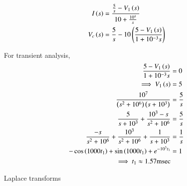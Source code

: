 \documentclass[journal,12pt,twocolumn]{IEEEtran}
\begin{document}
\begin{align}
    I\left(s\right) &= \frac{\frac{5}{s} - V_1\left(s\right)}{10 + \frac{10^4}{s}}\\
    V_c\left(s\right) &= \frac{5}{s} - 10\left(\frac{5-V_1\left(s\right)}{1+10^{-3}s}\right)
\end{align}

For transient analysis,
\begin{align}
    \frac{5-V_1\left(s\right)}{1+10^{-3}s} &= 0\\
    \implies V_1\left(s\right) &= 5\\
    \frac{10^7}{\left(s^2+10^6\right)\left(s+10^3\right)} &= \frac{5}{s}\\
    \frac{5}{s+10^3} + \frac{10^3-s}{s^2 + 10^6} &= \frac{5}{s}\\
    \frac{-s}{s^2+10^6} + \frac{10^3}{s^2 + 10^6} + \frac{1}{s+10^3} &= \frac{1}{s}\\
    -\cos\left(1000t_1\right)+\sin\left(1000t_1\right)+e^{-10^3 t_1} &= 1\\
    \implies t_1 \approx 1.57\text{msec}
\end{align}



\begin{table}[ht]
    
    \vspace{0.5cm}
    \caption{Laplace transforms}
    \label{tab:Gate.ee.54.1}
\end{table}
\end{document}

